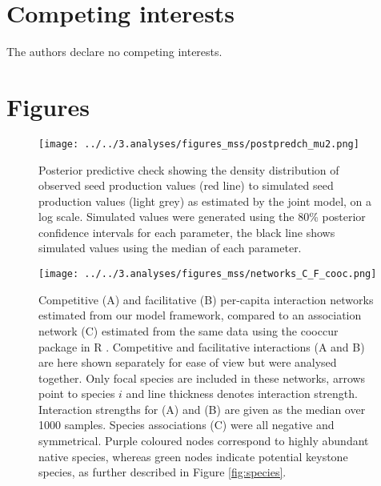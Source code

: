 \documentclass[a4,12pt]{article}
\begin{document}
\section*{Competing interests}

The authors declare no competing interests. 


\newpage

\printbibliography   

\newpage 

\section{Figures}


    \begin{figure}[H]
        \texttt{[image: ../../3.analyses/figures\_mss/postpredch\_mu2.png]}
        \caption{Posterior predictive check showing the density distribution of observed seed production values (red line) to simulated seed production values (light grey) as estimated by the joint model, on a log scale. Simulated values were generated using the 80\% posterior confidence intervals for each parameter, the black line shows simulated values using the median of each parameter. }
        \label{fig:ppcheckmu2}
    \end{figure}

    \begin{figure}[H]
        \begin{centering}
        \texttt{[image: ../../3.analyses/figures\_mss/networks\_C\_F\_cooc.png]}
        \caption{Competitive (A) and facilitative (B) per-capita interaction networks estimated from our model framework, compared to an association network (C) estimated from the same data using the cooccur package in R \parencite{Griffith2016}. Competitive and facilitative interactions (A and B) are here shown separately for ease of view but were analysed together. Only focal species are included in these networks, arrows point to species $i$ and line thickness denotes interaction strength. Interaction strengths for (A) and (B) are given as the median over 1000 samples. Species associations (C) were all negative and symmetrical. Purple coloured nodes correspond to highly abundant native species, whereas green nodes indicate potential keystone species, as further described in Figure \ref{fig:species}.}
        \label{fig:netwks}
       \end{centering}
    \end{figure}  
\end{document}

